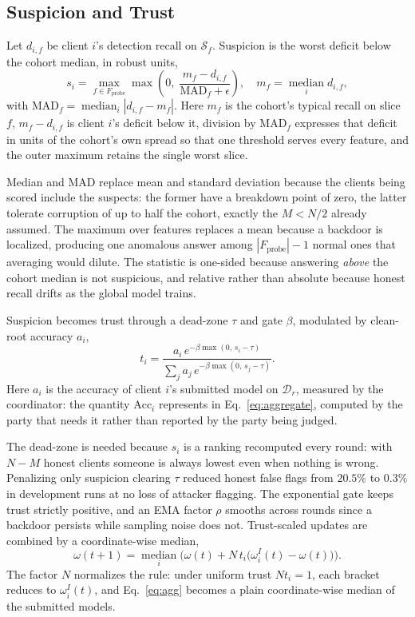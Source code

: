 \documentclass[conference]{IEEEtran}
\begin{document}
\subsection{Suspicion and Trust}
\label{sec:trust}

Let $d_{i,f}$ be client $i$'s detection recall on $\mathcal{S}_f$. Suspicion is
the worst deficit below the cohort median, in robust units,
\begin{equation}
s_i=\max_{f\in F_{\mathrm{probe}}}\max\!\left(0,\;\frac{m_f-d_{i,f}}{\mathrm{MAD}_f+\epsilon}\right),
\quad m_f=\operatorname*{median}_i d_{i,f},
\label{eq:susp}
\end{equation}
with $\mathrm{MAD}_f=\operatorname{median}_i|d_{i,f}-m_f|$. Here $m_f$ is the
cohort's typical recall on slice $f$, $m_f-d_{i,f}$ is client $i$'s deficit
below it, division by $\mathrm{MAD}_f$ expresses that deficit in units of the
cohort's own spread so that one threshold serves every feature, and the outer
maximum retains the single worst slice.

Median and MAD replace mean and standard deviation because the clients being
scored include the suspects: the former have a breakdown point of zero, the
latter tolerate corruption of up to half the cohort, exactly the $M<N/2$
already assumed. The maximum over features replaces a mean because a backdoor
is localized, producing one anomalous answer among $|F_{\mathrm{probe}}|-1$
normal ones that averaging would dilute. The statistic is one-sided because
answering \emph{above} the cohort median is not suspicious, and relative rather
than absolute because honest recall drifts as the global model trains.

Suspicion becomes trust through a dead-zone $\tau$ and gate $\beta$, modulated
by clean-root accuracy $a_i$,
\begin{equation}
t_i=\frac{a_i\,e^{-\beta\max(0,\,s_i-\tau)}}{\sum_j a_j\,e^{-\beta\max(0,\,s_j-\tau)}}.
\label{eq:trust}
\end{equation}
Here $a_i$ is the accuracy of client $i$'s submitted model on $\mathcal{D}_r$,
measured by the coordinator: the quantity $\mathrm{Acc}_i$ represents in
Eq.~\eqref{eq:aggregate}, computed by the party that needs it rather than
reported by the party being judged.

The dead-zone is needed because $s_i$ is a ranking recomputed every round: with
$N-M$ honest clients someone is always lowest even when nothing is wrong.
Penalizing only suspicion clearing $\tau$ reduced honest false flags from
$20.5\%$ to $0.3\%$ in development runs at no loss of attacker flagging. The
exponential gate keeps trust strictly positive, and an EMA factor $\rho$
smooths across rounds since a backdoor persists while sampling noise does not.
Trust-scaled updates are combined by a coordinate-wise median,
\begin{equation}
\omega(t+1)=\operatorname*{median}_i\Big(\omega(t)+N\,t_i\big(\omega_i^{I}(t)-\omega(t)\big)\Big).
\label{eq:agg}
\end{equation}
The factor $N$ normalizes the rule: under uniform trust $Nt_i=1$, each bracket
reduces to $\omega_i^{I}(t)$, and Eq.~\eqref{eq:agg} becomes a plain
coordinate-wise median of the submitted models.
\end{document}
